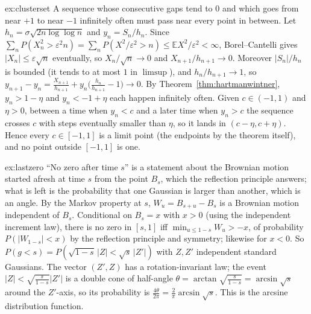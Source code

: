 \begin{solution}{ex:clusterset}
\idea A sequence whose consecutive gaps tend to $0$ and which goes from near $+1$ to near $-1$ infinitely often must pass near every point in between.
\writeup Let $h_n=\sigma\sqrt{2n\log\log n}$ and $y_n=S_n/h_n$. Since $\sum_nP(X_n^2>\varepsilon^2n)=\sum_nP(X^2/\varepsilon^2>n)\le\mathbb E X^2/\varepsilon^2<\infty$, Borel--Cantelli gives
$|X_n|\le\varepsilon\sqrt n$ eventually, so $X_n/\sqrt n\to0$ and $X_{n+1}/h_{n+1}\to0$. Moreover $|S_n|/h_n$ is bounded (it tends to at most $1$ in $\limsup$), and $h_n/h_{n+1}\to1$, so
$y_{n+1}-y_n=\frac{X_{n+1}}{h_{n+1}}+y_n\bigl(\frac{h_n}{h_{n+1}}-1\bigr)\to0$. By Theorem~\ref{thm:hartmanwintner}, $y_n>1-\eta$ and $y_n<-1+\eta$ each happen infinitely often. Given
$c\in(-1,1)$ and $\eta>0$, between a time when $y_n<c$ and a later time when $y_n>c$ the sequence crosses $c$ with steps eventually smaller than $\eta$, so it lands in $(c-\eta,c+\eta)$.
Hence every $c\in[-1,1]$ is a limit point (the endpoints by the theorem itself), and no point outside $[-1,1]$ is one.
\end{solution}

\begin{solution}{ex:lastzero}
\idea ``No zero after time $s$'' is a statement about the Brownian motion started afresh at time $s$ from the point $B_s$, which the reflection principle answers; what is left is
the probability that one Gaussian is larger than another, which is an angle.
\writeup By the Markov property at $s$, $W_u=B_{s+u}-B_s$ is a Brownian motion independent of $B_s$. Conditional on $B_s=x$ with $x>0$ (using the independent increment law), there is no zero in $[s,1]$ iff $\min_{u\le1-s}W_u>-x$,
of probability $P(|W_{1-s}|<x)$ by the reflection principle and symmetry; likewise for $x<0$. So $P(g<s)=P(\sqrt{1-s}\,|Z|<\sqrt s\,|Z'|)$ with $Z,Z'$ independent standard
Gaussians. The vector $(Z',Z)$ has a rotation-invariant law; the event $|Z|<\sqrt{\frac s{1-s}}|Z'|$ is a double cone of half-angle $\theta=\arctan\sqrt{\frac s{1-s}}=\arcsin\sqrt s$ around the
$Z'$-axis, so its probability is $\frac{4\theta}{2\pi}=\frac2\pi\arcsin\sqrt s$. This is the arcsine distribution function.
\end{solution}

